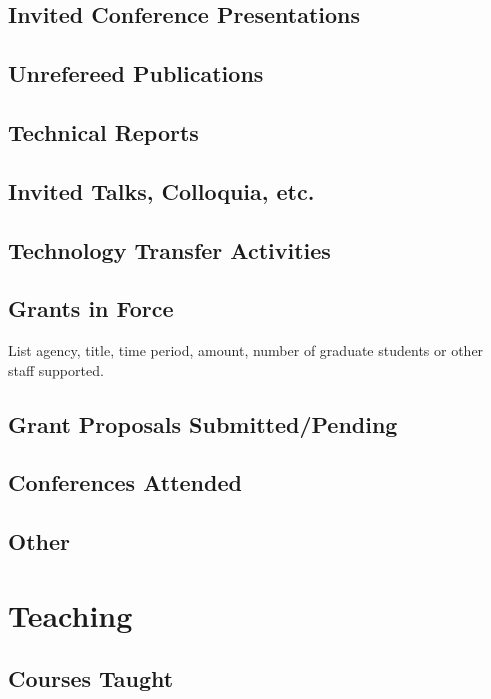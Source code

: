 \documentclass[12pt]{article}
\begin{document}
\subsection{Invited Conference Presentations}


\subsection{Unrefereed Publications}

\subsection{Technical Reports}

\subsection{Invited Talks, Colloquia, etc.}

\subsection{Technology Transfer Activities}

\subsection{Grants in Force}

List agency, title, time period, amount, number of graduate students
or other staff supported.

\subsection{Grant Proposals Submitted/Pending}

\subsection{Conferences Attended}

\subsection{Other}

\section{Teaching}

\subsection{Courses Taught}
\end{document}
